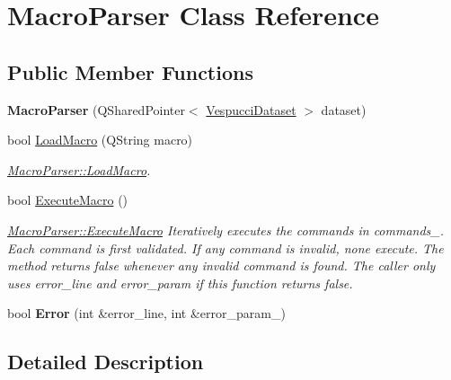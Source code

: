 \hypertarget{class_macro_parser}{}\section{Macro\+Parser Class Reference}
\label{class_macro_parser}
\subsection*{Public Member Functions}
\begin{DoxyCompactItemize}
\item 
{\bfseries Macro\+Parser} (Q\+Shared\+Pointer$<$ \hyperlink{class_vespucci_dataset}{Vespucci\+Dataset} $>$ dataset)\hypertarget{class_macro_parser_a0301a59c269a2fd00d38ce35f7eec58d}{}\label{class_macro_parser_a0301a59c269a2fd00d38ce35f7eec58d}

\item 
bool \hyperlink{class_macro_parser_aa4665646889e62019f894a60b8cff9ec}{Load\+Macro} (Q\+String macro)
\begin{DoxyCompactList}\small\item\em \hyperlink{class_macro_parser_aa4665646889e62019f894a60b8cff9ec}{Macro\+Parser\+::\+Load\+Macro}. \end{DoxyCompactList}\item 
bool \hyperlink{class_macro_parser_a4b2ee20c04071ccb10c9cbca0888c182}{Execute\+Macro} ()\hypertarget{class_macro_parser_a4b2ee20c04071ccb10c9cbca0888c182}{}\label{class_macro_parser_a4b2ee20c04071ccb10c9cbca0888c182}

\begin{DoxyCompactList}\small\item\em \hyperlink{class_macro_parser_a4b2ee20c04071ccb10c9cbca0888c182}{Macro\+Parser\+::\+Execute\+Macro} Iteratively executes the commands in commands\+\_\+. Each command is first validated. If any command is invalid, none execute. The method returns false whenever any invalid command is found. The caller only uses error\+\_\+line and error\+\_\+param if this function returns false. \end{DoxyCompactList}\item 
bool {\bfseries Error} (int \&error\+\_\+line, int \&error\+\_\+param\+\_\+)\hypertarget{class_macro_parser_a3b06ad2c47655d604d30f94699edcedc}{}\label{class_macro_parser_a3b06ad2c47655d604d30f94699edcedc}

\end{DoxyCompactItemize}


\subsection{Detailed Description}


